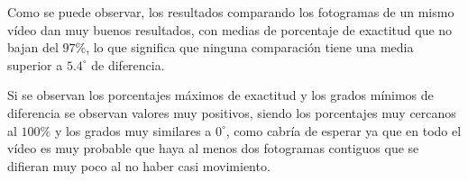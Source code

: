 \begin{table}[h]
	\centering
\caption{Tabla con los tiempos de la ejecución.}
\label{tab:tiempos}
\end{table}

Como se puede observar, los resultados comparando los fotogramas de un mismo vídeo dan muy buenos resultados, con medias de porcentaje de exactitud que no bajan del $97\%$, lo que significa que ninguna comparación tiene una media superior a $5.4^{\circ}$ de diferencia.

Si se observan los porcentajes máximos de exactitud y los grados mínimos de diferencia se observan valores muy positivos, siendo los porcentajes muy cercanos al $100\%$ y los grados muy similares a $0^{\circ}$, como cabría de esperar ya que en todo el vídeo es muy probable que haya al menos dos fotogramas contiguos que se difieran muy poco al no haber casi movimiento.

